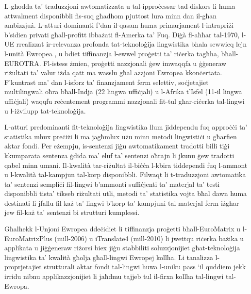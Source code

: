 \begin{multicols}{2}
L-għodda ta’ traduzzjoni awtomatizzata u tal-ipproċessar tad-diskors li huma attwalment disponibbli fis-suq għadhom pjuttost lura minn dan il-għan ambizzjuż. L-atturi dominanti f’dan il-qasam huma primarjament l-intrapriżi b’sidien privati għall-profitt ibbażati fl-Amerka ta’ Fuq. Diġà fl-aħħar tal-1970, l-UE rrealizzat ir-relevanza profonda tat-teknoloġija lingwistika bħala sewwieq lejn l-unità Ewropea , u bdiet tiffinanzja l-ewwel proġetti ta’ riċerka tagħha, bħall-EUROTRA. Fl-istess żmien, proġetti nazzjonali ġew imwaqqfa u ġġeneraw riżultati ta’ valur iżda qatt ma wasslu għal azzjoni Ewropea kkonċertata. F’kuntrast ma’ dan l-isforz ta’ finanzjament ferm selettiv, soċjetajiet multilingwali oħra bħall-Indja (22 lingwa uffiċjali) u l-Afrika t’Isfel (11-il lingwa uffiċjali) waqqfu reċentement programmi nazzjonali fit-tul għar-riċerka tal-lingwi u l-iżvilupp tat-teknoloġija.
   
L-atturi predominanti fit-teknoloġija lingwistika llum jiddependu fuq  approċċi ta’ statistika mhux preċiżi li ma jagħmlux użu minn metodi lingwistiċi u għarfien aktar fondi. Per eżempju, is-sentenzi jiġu awtomatikament tradotti billi tiġi kkumparata sentenza ġdida ma’ eluf ta’ sentenzi oħrajn li jkunu ġew tradotti qabel minn umani. Il-kwalità tar-riżultat il-biċċa l-kbira tiddependi fuq l-ammont u l-kwalità tal-kampjun tal-korp disponibbli. Filwaqt li t-traduzzjoni awtomatika ta’ sentenzi sempliċi fil-lingwi b’ammonti suffiċjenti ta’ materjal ta’ testi disponibbli tista’ tikseb riżultati utli, metodi ta’ statistika vojta bħal dawn huma destinati li jfallu fil-każ ta’ lingwi b’korp ta’ kampjuni tal-materjal ferm iżgħar jew fil-każ ta’ sentenzi bi strutturi kumplessi. 
   
 
Għalhekk l-Unjoni Ewropea ddeċidiet li tiffinanzja proġetti bħall-EuroMatrix u l-EuroMatrixPlus (mill-2006) u iTranslate4 (mill-2010) li jwettqu riċerka bażika u applikata u jiġġeneraw riżorsi biex jiġu stabbiliti soluzzjonijiet għat-teknoloġija lingwistika ta’ kwalità għolja għall-lingwi Ewropej kollha. Li tanalizza l-proprjetajiet strutturali aktar fondi tal-lingwi huwa l-uniku pass ‘il quddiem jekk irridu nibnu applikazzjonijiet li jaħdmu tajjeb tul il-firxa kollha tal-lingwi tal-Ewropa.
   

\end{multicols}
